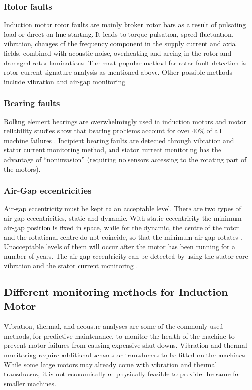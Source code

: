 \documentclass[a4paper,11pt]{report}
\begin{document}
\subsubsection*{Rotor faults} 
Induction motor rotor faults are mainly broken rotor bars as a result of pulsating load or direct on-line starting. It leads to torque pulsation, speed fluctuation, vibration, changes of the frequency component in the supply current and axial fields, combined with acoustic noise, overheating and arcing in the rotor and damaged rotor laminations. The most popular method for rotor fault detection is rotor current signature analysis as mentioned above. Other possible methods include vibration and air-gap monitoring.

\subsubsection*{Bearing faults}
Rolling element bearings are overwhelmingly used in induction motors and motor reliability studies show that bearing problems account for over 40\% of all machine failures \cite{59}. Incipient bearing faults are detected through vibration and stator current monitoring method, and stator current monitoring has the advantage of ``noninvasion'' (requiring no sensors accessing to the rotating part of the motors).

\subsubsection*{Air-Gap eccentricities}
Air-gap eccentricity must be kept to an acceptable level. There are two types of air-gap eccentricities, static and dynamic. With static eccentricity the minimum air-gap position is fixed in space, while for the dynamic, the centre of the rotor and the rotational centre do not coincide, so that the minimum air gap rotates \cite{rps6}. Unacceptable levels of them will occur after the motor has been running for a number of years. The air-gap eccentricity can be detected by using the stator core vibration and the stator current monitoring \cite{rps6}. 

\subsection{Different monitoring methods for Induction Motor}
Vibration, thermal, and acoustic analyses are some of the commonly used methods, for predictive maintenance, to monitor the health of the machine to prevent motor failures from causing expensive shut-downs. Vibration and thermal monitoring require additional sensors or transducers to be fitted on the machines. While some large motors may already come with vibration and thermal transducers, it is not economically or physically feasible to provide the same for smaller machines.
\end{document}
